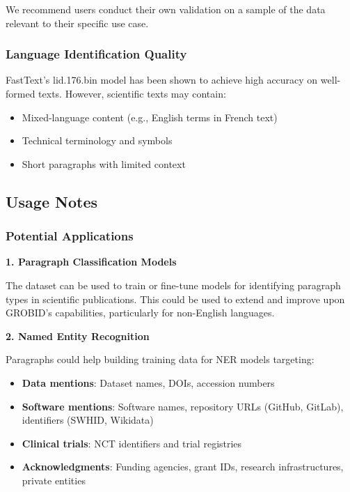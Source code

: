 \documentclass[
]{article}
\providecommand{\tightlist}{%
  \setlength{\itemsep}{0pt}\setlength{\parskip}{0pt}}
\begin{document}
We recommend users conduct their own validation on a sample of the data
relevant to their specific use case.

\hypertarget{language-identification-quality}{%
\subsubsection{Language Identification
Quality}\label{language-identification-quality}}

FastText's lid.176.bin model has been shown to achieve high accuracy on
well-formed texts. However, scientific texts may contain:

\begin{itemize}
\tightlist
\item
  Mixed-language content (e.g., English terms in French text)
\item
  Technical terminology and symbols
\item
  Short paragraphs with limited context
\end{itemize}

\hypertarget{usage-notes}{%
\subsection{Usage Notes}\label{usage-notes}}

\hypertarget{potential-applications}{%
\subsubsection{Potential Applications}\label{potential-applications}}

\textbf{1. Paragraph Classification Models}

The dataset can be used to train or fine-tune models for identifying
paragraph types in scientific publications. This could be used to extend
and improve upon GROBID's capabilities, particularly for non-English
languages.

\textbf{2. Named Entity Recognition}

Paragraphs could help building training data for NER models targeting:

\begin{itemize}
\tightlist
\item
  \textbf{Data mentions}: Dataset names, DOIs, accession numbers
\item
  \textbf{Software mentions}: Software names, repository URLs (GitHub,
  GitLab), identifiers (SWHID, Wikidata)
\item
  \textbf{Clinical trials}: NCT identifiers and trial registries
\item
  \textbf{Acknowledgments}: Funding agencies, grant IDs, research
  infrastructures, private entities
\end{itemize}
\end{document}
